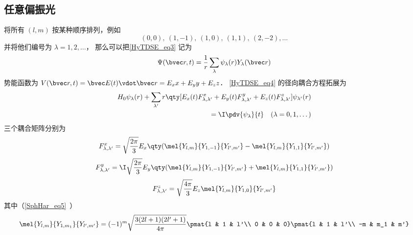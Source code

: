 \subsection{任意偏振光}
将所有 $(l,m)$ 按某种顺序排列，例如
\begin{equation}
(0, 0),\ (1,-1),\ (1,0),\ (1,1),\ (2,-2), \dots
\end{equation}
并将他们编号为 $\lambda = 1,2, \dots$， 那么可以把\autoref{HyTDSE_eq3} 记为
\begin{equation}
\Psi(\bvec r, t) = \frac{1}{r}\sum_\lambda \psi_\lambda(r) Y_\lambda(\bvec r)
\end{equation}
势能函数为 $V(\bvec r, t) = \bvec E(t) \vdot \bvec r  = E_x x + E_y y + E_z z$．
\autoref{HyTDSE_eq4} 的径向耦合方程拓展为
\begin{equation}
\begin{aligned}
H_0 \psi_{\lambda}(r) + \sum_{\lambda'} r \qty[E_x(t) F_{\lambda, \lambda'}^{x} + E_y(t) F_{\lambda, \lambda'}^{y} + E_z(t) F_{\lambda, \lambda'}^{z}] \psi_{\lambda'}(r) \\
= \I \pdv{\psi_{\lambda}}{t} \quad (\lambda=0,1,\dots)
\end{aligned}
\end{equation}
三个耦合矩阵分别为
\begin{equation}
\begin{aligned}
F_{\lambda,\lambda'}^{x} = \sqrt{\frac{2\pi}{3}} E_x \qty(\mel{Y_{l,m}}{Y_{1,-1}}{Y_{l',m'}} - \mel{Y_{l,m}}{Y_{1,1}}{Y_{l',m'}})
\end{aligned}
\end{equation}
\begin{equation}
\begin{aligned}
F_{\lambda,\lambda'}^{y} = \I\sqrt{\frac{2\pi}{3}} E_y \qty(\mel{Y_{l,m}}{Y_{1,-1}}{Y_{l',m'}} + \mel{Y_{l,m}}{Y_{1,1}}{Y_{l',m'}})
\end{aligned}
\end{equation}
\begin{equation}
\begin{aligned}
F_{\lambda,\lambda'}^{z} = \sqrt{\frac{4\pi}{3}} E_z \mel{Y_{l,m}}{Y_{1,0}}{Y_{l',m'}}
\end{aligned}
\end{equation}
其中（\autoref{SphHar_eq5}~）
\begin{equation}
\mel{Y_{l,m}}{Y_{1,m_1}}{Y_{l',m'}} = (-1)^m\sqrt{\frac{3(2l+1)(2l'+1)}{4\pi}} \pmat{l & 1 & l'\\ 0 & 0 & 0}\pmat{l & 1 & l'\\ -m & m_1 & m'}
\end{equation}


